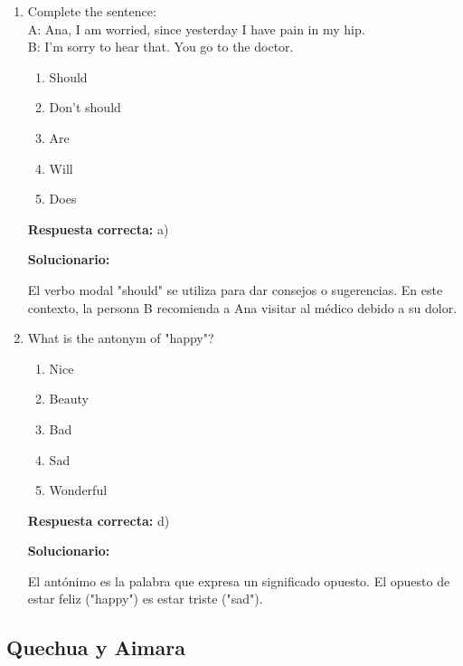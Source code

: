 \begin{enumerate}[resume]

	\item Complete the sentence: \\
	A: Ana, I am worried, since yesterday I have pain in my hip. \\
	B: I'm sorry to hear that. You \underline{\hspace{2cm}} go to the doctor.
	\begin{enumerate}[label=\alph*)]
		\item Should
		\item Don't should
		\item Are
		\item Will
		\item Does
	\end{enumerate}
	\textbf{Respuesta correcta:} a)

	\vspace{2mm}
	\textbf{Solucionario:}

	El verbo modal "should" se utiliza para dar consejos o sugerencias. En este contexto, la persona B recomienda a Ana visitar al médico debido a su dolor.

	\vspace{6mm}

	\item What is the antonym of "happy"?
	\begin{enumerate}[label=\alph*)]
		\item Nice
		\item Beauty
		\item Bad
		\item Sad
		\item Wonderful
	\end{enumerate}
	\textbf{Respuesta correcta:} d)

	\vspace{2mm}
	\textbf{Solucionario:}

	El antónimo es la palabra que expresa un significado opuesto. El opuesto de estar feliz ("happy") es estar triste ("sad").

	\vspace{6mm}

\end{enumerate}

\subsection*{Quechua y Aimara}

